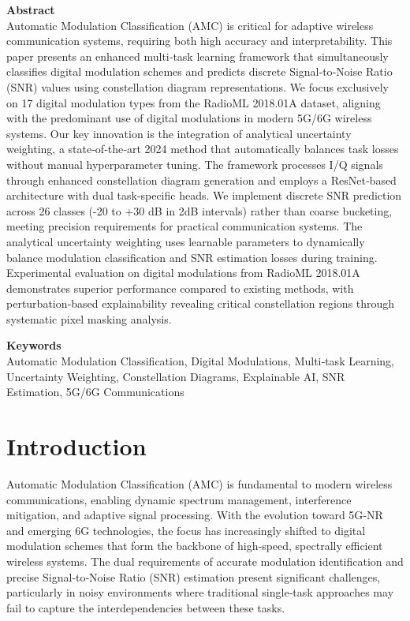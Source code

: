 \documentclass{ELSP}
\begin{document}
\vspace{0.5em}
\noindent\textbf{\textcolor[RGB]{0,131,255}{Abstract}}\\
Automatic Modulation Classification (AMC) is critical for adaptive wireless communication systems, requiring both high accuracy and interpretability. This paper presents an enhanced multi‑task learning framework that simultaneously classifies digital modulation schemes and predicts discrete Signal‑to‑Noise Ratio (SNR) values using constellation diagram representations. We focus exclusively on 17 digital modulation types from the RadioML 2018.01A dataset, aligning with the predominant use of digital modulations in modern 5G/6G wireless systems. Our key innovation is the integration of analytical uncertainty weighting, a state‑of‑the‑art 2024 method that automatically balances task losses without manual hyperparameter tuning. The framework processes I/Q signals through enhanced constellation diagram generation and employs a ResNet‑based architecture with dual task‑specific heads. We implement discrete SNR prediction across 26 classes (-20 to +30 dB in 2dB intervals) rather than coarse bucketing, meeting precision requirements for practical communication systems. The analytical uncertainty weighting uses learnable parameters to dynamically balance modulation classification and SNR estimation losses during training. Experimental evaluation on digital modulations from RadioML 2018.01A demonstrates superior performance compared to existing methods, with perturbation‑based explainability revealing critical constellation regions through systematic pixel masking analysis.

\vspace{0.5em}
\noindent\textbf{\textcolor[RGB]{0,131,255}{Keywords}}\\
Automatic Modulation Classification, Digital Modulations, Multi‑task Learning, Uncertainty Weighting, Constellation Diagrams, Explainable AI, SNR Estimation, 5G/6G Communications

\section{Introduction}

Automatic Modulation Classification (AMC) \cite{thien2021survey} is fundamental to modern wireless communications, enabling dynamic spectrum management, interference mitigation, and adaptive signal processing. With the evolution toward 5G‑NR and emerging 6G technologies, the focus has increasingly shifted to digital modulation schemes that form the backbone of high‑speed, spectrally efficient wireless systems. The dual requirements of accurate modulation identification and precise Signal‑to‑Noise Ratio (SNR) estimation present significant challenges, particularly in noisy environments where traditional single‑task approaches may fail to capture the interdependencies between these tasks.
\end{document}
